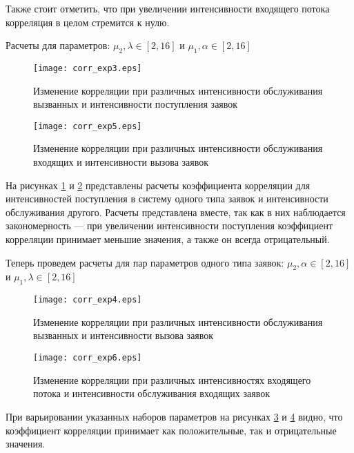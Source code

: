 Также стоит отметить, что при увеличении интенсивности входящего потока корреляция в целом стремится к нулю.

Расчеты для параметров: $\mu_{2},\lambda \in [2,16]$ и $\mu_{1},\alpha \in [2,16]$
\begin{figure}[H]
	\centering
	\texttt{[image: corr\_exp3.eps]}
	\caption{Изменение корреляции при различных интенсивности обслуживания вызванных и интенсивности поступления заявок}
	\label{exps_corr_exp3}
\end{figure} 

\begin{figure}[H]
	\centering
	\texttt{[image: corr\_exp5.eps]}
	\caption{Изменение корреляции при различных интенсивности обслуживания входящих и интенсивности вызова заявок}
	\label{exps_corr_exp5}
\end{figure} 

На рисунках \ref{exps_corr_exp3} и \ref{exps_corr_exp5} представлены расчеты коэффициента корреляции для интенсивностей поступления в систему одного типа заявок и интенсивности обслуживания другого. Расчеты представлена вместе, так как в них наблюдается закономерность --- при увеличении интенсивности поступления коэффициент корреляции принимает меньшие значения, а также он всегда отрицательный.

Теперь проведем расчеты для пар параметров одного типа заявок: $\mu_{2},\alpha \in [2,16]$ и $\mu_{1},\lambda \in [2,16]$
\begin{figure}[H]
	\centering
	\texttt{[image: corr\_exp4.eps]}
	\caption{Изменение корреляции при различных интенсивности обслуживания вызванных и интенсивности вызова заявок}
	\label{exps_corr_exp4}
\end{figure} 

\begin{figure}[H]
	\centering
	\texttt{[image: corr\_exp6.eps]}
	\caption{Изменение корреляции при различных интенсивностях входящего потока и интенсивности обслуживания входящих заявок}
	\label{exps_corr_exp6}
\end{figure} 

При варьировании указанных наборов параметров на рисунках \ref{exps_corr_exp4} и \ref{exps_corr_exp6} видно, что коэффициент корреляции принимает как положительные, так и отрицательные значения.


